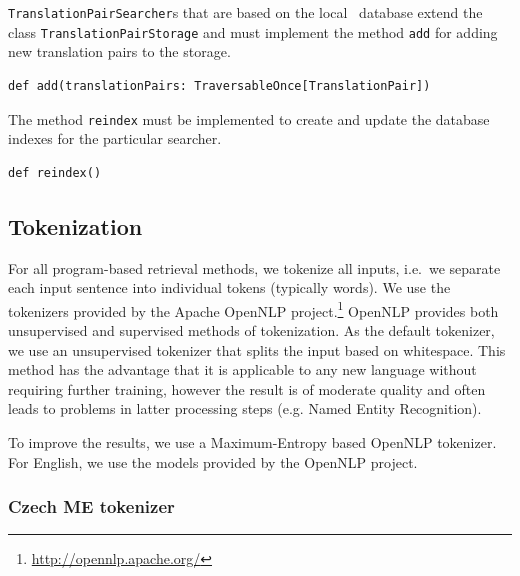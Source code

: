 \vspace*{0.5em}



{\tt TranslationPairSearcher}s that are based on the local \postgres~database extend the class {\tt TranslationPairStorage} and must implement the method {\tt add} for adding new translation pairs to the storage.

\vspace*{0.5em}
 
\begin{lstlisting}
def add(translationPairs: TraversableOnce[TranslationPair])
\end{lstlisting}

\vspace*{0.5em}


The method {\tt reindex} must be implemented to create and update the database indexes for the particular searcher.

\begin{lstlisting}
def reindex()
\end{lstlisting}








\subsection{Tokenization}
\label{sec:tokenization}

For all program-based retrieval methods, we tokenize all inputs, i.e.\ we separate each input sentence into individual tokens (typically words). 
We use the tokenizers provided by the Apache OpenNLP project.\footnote{\url{http://opennlp.apache.org/}}
OpenNLP provides both unsupervised and supervised methods of tokenization. 
As the default tokenizer, we use an unsupervised tokenizer that splits the input
based on whitespace. This method has the advantage that it is applicable to any new
language without requiring further training, however the result is of moderate
quality and often leads to problems in latter processing steps (e.g. Named Entity Recognition).

To improve the results, we use a Maximum-Entropy based OpenNLP tokenizer. For English, we use the
models provided by the OpenNLP project. 


\subsubsection*{Czech ME tokenizer}

